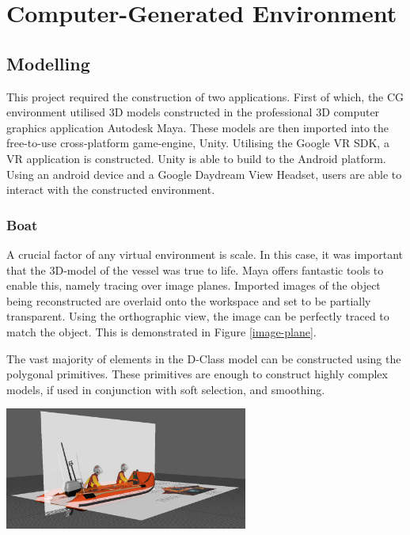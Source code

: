 \documentclass[a4paper, openright, twoside]{book}
\begin{document}
\section{Computer-Generated Environment}
\subsection{Modelling}
This project required the construction of two applications. First of which, the CG environment utilised 3D models constructed in the professional 3D computer graphics application Autodesk Maya. These models are then imported into the free-to-use cross-platform game-engine, Unity. Utilising the Google VR SDK, a VR application is constructed. Unity is able to build to the Android platform. Using an android device and a Google Daydream View Headset, users are able to interact with the constructed environment.

\subsubsection{Boat}
A crucial factor of any virtual environment is scale. In this case, it was important that the 3D-model of the vessel was true to life. Maya offers fantastic tools to enable this, namely tracing over image planes. Imported images of the object being reconstructed are overlaid onto the workspace and set to be partially transparent. Using the orthographic view, the image can be perfectly traced to match the object. This is demonstrated in Figure \ref{image-plane}. 

The vast majority of elements in the D-Class model can be constructed using the polygonal primitives. These primitives are enough to construct highly complex models, if used in conjunction with soft selection, and smoothing.

\begin{minipage}{\textwidth}
\hfill \break
\centering
\includegraphics[width=0.6\textwidth]{images/image_planes}
\label{image-plane}
\hfill \break
\end{minipage}
\end{document}
